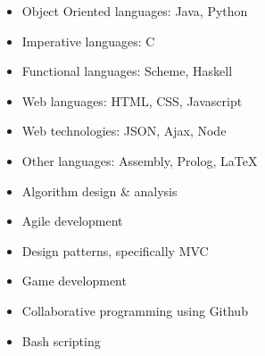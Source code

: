 \documentclass[]{friggeri-cv} %
\begin{document}
\begin{minipage}[t]{0.5\textwidth}
\begin{itemize}
\item{Object Oriented languages: Java, Python}
\item{Imperative languages: C}
\item{Functional languages: Scheme, Haskell}
\item{Web languages: HTML, CSS, Javascript}
\item{Web technologies: JSON, Ajax, Node}
\item{Other languages: Assembly, Prolog, \LaTeX}
\end{itemize}
\end{minipage}
\begin{minipage}[t]{0.5\textwidth}
\begin{itemize}
\item{Algorithm design \& analysis}
\item{Agile development}
\item{Design patterns, specifically MVC}
\item{Game development}
\item{Collaborative programming using Github}
\item{Bash scripting}
\end{itemize}
\end{minipage}


\end{document}
